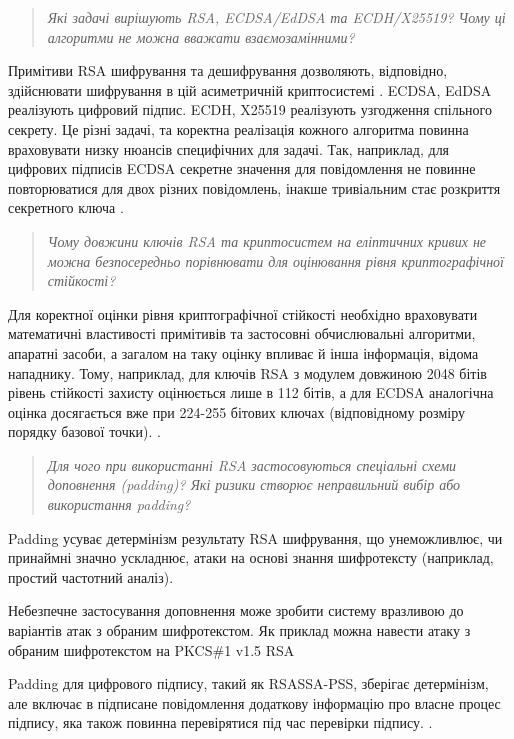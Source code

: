 \documentclass{kpi-lab}
\begin{document}
\begin{quote}\small\it
  Які задачі вирішують RSA, ECDSA/EdDSA та ECDH/X25519?
  Чому ці алгоритми не можна вважати взаємозамінними?
\end{quote}

Примітиви RSA шифрування та дешифрування дозволяють,
відповідно, здійснювати шифрування в цій асиметричній
криптосистемі \cite{nist-sp-800-56ar3}.
ECDSA, EdDSA реалізують цифровий підпис.
ECDH, X25519 реалізують узгодження спільного секрету.
Це різні задачі, та коректна реалізація кожного алгоритма повинна
враховувати низку нюансів специфічних для задачі. Так,
наприклад, для цифрових підписів ECDSA секретне значення
для повідомлення не повинне повторюватися для двох різних повідомлень,
інакше тривіальним стає розкриття секретного ключа
\cite{cryptoeprint:2025/654, MECANISMES-CRYPTO-1.0}.

\begin{quote}\small\it
  Чому довжини ключів RSA та криптосистем на еліптичних
  кривих не можна безпосередньо порівнювати для оцінювання
  рівня криптографічної стійкості?
\end{quote}

Для коректної оцінки рівня криптографічної стійкості
необхідно враховувати математичні властивості примітивів та застосовні
обчислювальні алгоритми, апаратні засоби, а загалом на таку
оцінку впливає й інша інформація, відома нападнику.
Тому, наприклад, для ключів RSA з модулем довжиною 2048 бітів
рівень стійкості захисту оцінюється лише в 112 бітів,
а для ECDSA аналогічна оцінка досягається вже при 224-255
бітових ключах (відповідному розміру порядку базової точки).
\cite{nist-sp-800-57pt1r5}.

\begin{quote}\small\it
  Для чого при використанні RSA застосовуються спеціальні
  схеми доповнення (padding)? Які ризики створює
  неправильний вибір або використання padding?
\end{quote}

Padding усуває детермінізм результату RSA шифрування, що
унеможливлює, чи принаймні значно ускладнює,
атаки на основі знання шифротексту (наприклад, простий
частотний аналіз).

Небезпечне застосування доповнення може зробити систему вразливою до
варіантів атак з обраним шифротекстом. Як приклад можна навести
атаку з обраним шифротекстом на PKCS\#1 v1.5 RSA
\cite{Bleichenbacher1998}

Padding для цифрового підпису, такий як RSASSA-PSS,
зберігає детермінізм,
але включає в підписане повідомлення додаткову інформацію
про власне процес підпису, яка також повинна перевірятися
під час перевірки підпису.
\cite{fips186-5}.
\end{document}
